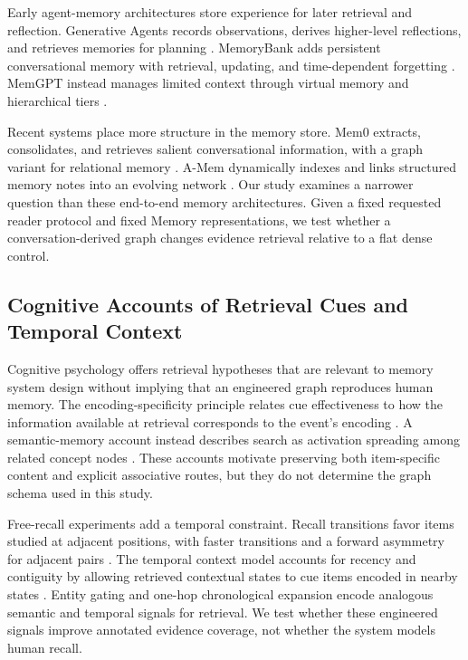 \documentclass[a4paper,twoside]{article}
\begin{document}
Early agent-memory architectures store experience for later retrieval and
reflection. Generative Agents records observations, derives higher-level
reflections, and retrieves memories for planning
\cite{park2023generative}. MemoryBank adds persistent conversational memory
with retrieval, updating, and time-dependent forgetting
\cite{zhong2024memorybank}. MemGPT instead manages limited context through
virtual memory and hierarchical tiers \cite{packer2023memgpt}.

Recent systems place more structure in the memory store. Mem0 extracts,
consolidates, and retrieves salient conversational information, with a graph
variant for relational memory \cite{chhikara2025mem0}. A-Mem dynamically
indexes and links structured memory notes into an evolving network
\cite{xu2025amem}. Our study examines a narrower question than these
end-to-end memory architectures. Given a fixed requested reader protocol and
fixed Memory representations, we test whether a conversation-derived graph
changes evidence retrieval relative to a flat dense control.

\subsection{Cognitive Accounts of Retrieval Cues and Temporal Context}

Cognitive psychology offers retrieval hypotheses that are relevant to memory
system design without implying that an engineered graph reproduces human
memory. The encoding-specificity principle relates cue effectiveness to how
the information available at retrieval corresponds to the event's encoding
\cite{tulving1973encoding}. A semantic-memory account instead describes
search as activation spreading among related concept nodes
\cite{collins1975spreading}. These accounts motivate preserving both
item-specific content and explicit associative routes, but they do not
determine the graph schema used in this study.

Free-recall experiments add a temporal constraint. Recall transitions favor
items studied at adjacent positions, with faster transitions and a forward
asymmetry for adjacent pairs \cite{kahana1996associative}. The temporal
context model accounts for recency and contiguity by allowing retrieved
contextual states to cue items encoded in nearby states
\cite{howard2002temporal}. Entity gating and one-hop chronological expansion
encode analogous semantic and temporal signals for retrieval. We test whether
these engineered signals improve annotated evidence coverage, not whether the
system models human recall.
\end{document}
